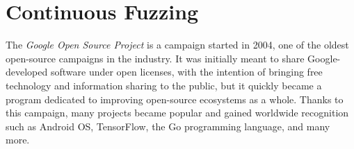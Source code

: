 \newpage
\section{Continuous Fuzzing}

The \textit{Google Open Source Project} \cite{google_oss} is a campaign started in 2004, one of the oldest open-source campaigns in the industry. 
\newline
It was initially meant to share Google-developed software under open licenses, with the intention of bringing free technology and information sharing to the public, but it quickly became a program dedicated to improving open-source ecosystems as a whole. 
\newline \newline
Thanks to this campaign, many projects became popular and gained worldwide recognition such as Android OS, TensorFlow, the Go programming language, and many more.

\ \\
